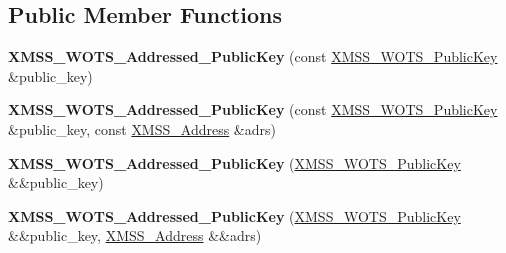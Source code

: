 \subsection*{Public Member Functions}
\begin{DoxyCompactItemize}
\item 
\mbox{\label{class_botan_1_1_x_m_s_s___w_o_t_s___addressed___public_key_a302bd0275003cdbb6ad435d68bf3e6b3}} 
{\bfseries X\+M\+S\+S\+\_\+\+W\+O\+T\+S\+\_\+\+Addressed\+\_\+\+Public\+Key} (const \mbox{\hyperlink{class_botan_1_1_x_m_s_s___w_o_t_s___public_key}{X\+M\+S\+S\+\_\+\+W\+O\+T\+S\+\_\+\+Public\+Key}} \&public\+\_\+key)
\item 
\mbox{\label{class_botan_1_1_x_m_s_s___w_o_t_s___addressed___public_key_afa3b6034e4b28a8c2ed5532b73acb450}} 
{\bfseries X\+M\+S\+S\+\_\+\+W\+O\+T\+S\+\_\+\+Addressed\+\_\+\+Public\+Key} (const \mbox{\hyperlink{class_botan_1_1_x_m_s_s___w_o_t_s___public_key}{X\+M\+S\+S\+\_\+\+W\+O\+T\+S\+\_\+\+Public\+Key}} \&public\+\_\+key, const \mbox{\hyperlink{class_botan_1_1_x_m_s_s___address}{X\+M\+S\+S\+\_\+\+Address}} \&adrs)
\item 
\mbox{\label{class_botan_1_1_x_m_s_s___w_o_t_s___addressed___public_key_a8cafd2c7b8e0840cba263130bfb9b486}} 
{\bfseries X\+M\+S\+S\+\_\+\+W\+O\+T\+S\+\_\+\+Addressed\+\_\+\+Public\+Key} (\mbox{\hyperlink{class_botan_1_1_x_m_s_s___w_o_t_s___public_key}{X\+M\+S\+S\+\_\+\+W\+O\+T\+S\+\_\+\+Public\+Key}} \&\&public\+\_\+key)
\item 
\mbox{\label{class_botan_1_1_x_m_s_s___w_o_t_s___addressed___public_key_a6ba9305905a6106ef9469217e071c62d}} 
{\bfseries X\+M\+S\+S\+\_\+\+W\+O\+T\+S\+\_\+\+Addressed\+\_\+\+Public\+Key} (\mbox{\hyperlink{class_botan_1_1_x_m_s_s___w_o_t_s___public_key}{X\+M\+S\+S\+\_\+\+W\+O\+T\+S\+\_\+\+Public\+Key}} \&\&public\+\_\+key, \mbox{\hyperlink{class_botan_1_1_x_m_s_s___address}{X\+M\+S\+S\+\_\+\+Address}} \&\&adrs)
\item 
\mbox{\label{class_botan_1_1_x_m_s_s___w_o_t_s___addressed___public_key_a10c173c2b5ea8f23a314b6ddbc876b86}} 

\end{DoxyCompactItemize}

